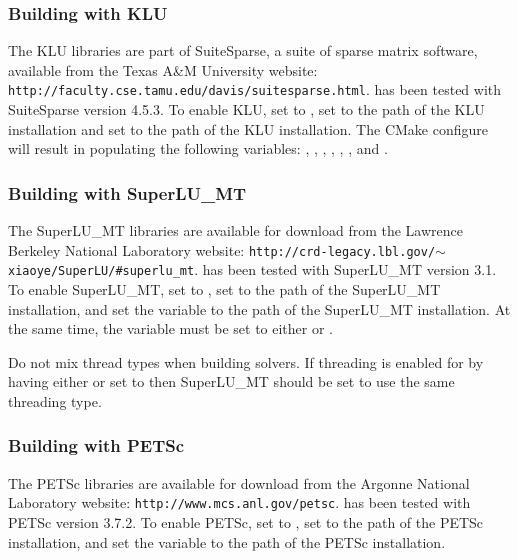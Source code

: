 \subsubsection*{Building with KLU}
The KLU libraries are part of SuiteSparse, a suite of sparse matrix software,
available from the Texas A\&M University website: {\tt http://faculty.cse.tamu.edu/davis/suitesparse.html}.
{\sundials} has been tested with SuiteSparse version 4.5.3.
To enable KLU, set  to , set  to the 
path of the KLU installation and set  to the  path of the KLU installation.
The CMake configure will result in populating the following variables: ,
, , ,
, , and
\newline{}.

\subsubsection*{Building with SuperLU\_MT}
The SuperLU\_MT libraries are available for download from the Lawrence Berkeley National Laboratory website:
{\tt http://crd-legacy.lbl.gov/$\sim$xiaoye/SuperLU/\#superlu\_mt}. 
{\sundials} has been tested with SuperLU\_MT version 3.1. 
To enable SuperLU\_MT, set   to , set 
to the  path of the SuperLU\_MT installation, and set the variable
\newline{} to the  path of the SuperLU\_MT installation.
At the same time, the variable
 must be set to either  or .

\noindent Do not mix thread types when building {\sundials} solvers.
If threading is enabled for {\sundials} by having either  or  set to 
then SuperLU\_MT should be set to use the same threading type.{\warn}

\subsubsection*{Building with PETSc}
The PETSc libraries are available for download from the Argonne National Laboratory website:
{\tt http://www.mcs.anl.gov/petsc}. 
{\sundials} has been tested with PETSc version 3.7.2. 
To enable PETSc, set   to , set 
to the  path of the PETSc installation, and set the variable
 to the  path of the PETSc installation.

